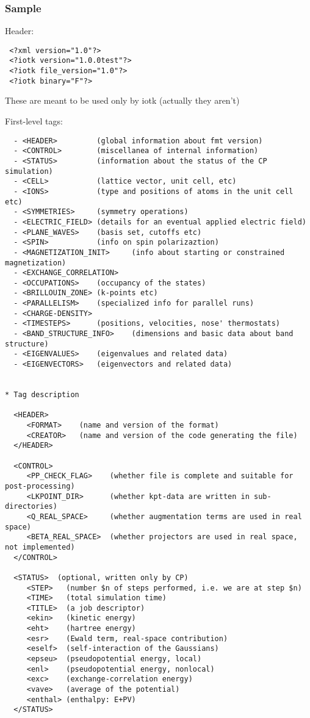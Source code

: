 \documentclass[12pt,a4paper]{article}
\begin{document}
\subsubsection{Sample}
Header:
\begin{verbatim}
 <?xml version="1.0"?>
 <?iotk version="1.0.0test"?>
 <?iotk file_version="1.0"?>
 <?iotk binary="F"?>
\end{verbatim}
These are meant to be used only by iotk (actually they aren't)

First-level tags:
\begin{verbatim}
  - <HEADER>         (global information about fmt version)
  - <CONTROL>        (miscellanea of internal information)
  - <STATUS>         (information about the status of the CP simulation)
  - <CELL>           (lattice vector, unit cell, etc)
  - <IONS>           (type and positions of atoms in the unit cell etc)
  - <SYMMETRIES>     (symmetry operations)
  - <ELECTRIC_FIELD> (details for an eventual applied electric field)
  - <PLANE_WAVES>    (basis set, cutoffs etc)
  - <SPIN>           (info on spin polarizaztion)
  - <MAGNETIZATION_INIT>     (info about starting or constrained magnetization)
  - <EXCHANGE_CORRELATION>
  - <OCCUPATIONS>    (occupancy of the states)
  - <BRILLOUIN_ZONE> (k-points etc)
  - <PARALLELISM>    (specialized info for parallel runs)
  - <CHARGE-DENSITY>
  - <TIMESTEPS>      (positions, velocities, nose' thermostats)
  - <BAND_STRUCTURE_INFO>    (dimensions and basic data about band structure)
  - <EIGENVALUES>    (eigenvalues and related data)
  - <EIGENVECTORS>   (eigenvectors and related data)


* Tag description

  <HEADER>
     <FORMAT>    (name and version of the format)
     <CREATOR>   (name and version of the code generating the file)
  </HEADER>

  <CONTROL>
     <PP_CHECK_FLAG>    (whether file is complete and suitable for post-processing)
     <LKPOINT_DIR>      (whether kpt-data are written in sub-directories)
     <Q_REAL_SPACE>     (whether augmentation terms are used in real space)
     <BETA_REAL_SPACE>  (whether projectors are used in real space, not implemented)
  </CONTROL>

  <STATUS>  (optional, written only by CP)
     <STEP>   (number $n of steps performed, i.e. we are at step $n)
     <TIME>   (total simulation time)
     <TITLE>  (a job descriptor)
     <ekin>   (kinetic energy)
     <eht>    (hartree energy)
     <esr>    (Ewald term, real-space contribution)
     <eself>  (self-interaction of the Gaussians)
     <epseu>  (pseudopotential energy, local)
     <enl>    (pseudopotential energy, nonlocal)
     <exc>    (exchange-correlation energy)
     <vave>   (average of the potential)
     <enthal> (enthalpy: E+PV)
  </STATUS>


\end{verbatim}
\end{document}
